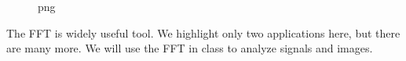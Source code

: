 \begin{figure}
\centering
{}
\caption{png}
\end{figure}

The FFT is widely useful tool. We highlight only two applications here,
but there are many more. We will use the FFT in class to analyze signals
and images.
